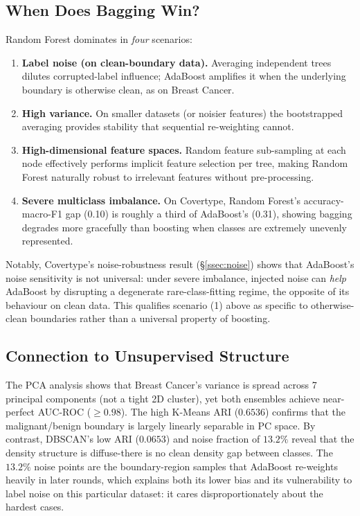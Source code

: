 \documentclass[conference]{IEEEtran}
\begin{document}
\subsection{When Does Bagging Win?}
Random Forest dominates in \emph{four} scenarios:
\begin{enumerate}
  \item \textbf{Label noise (on clean-boundary data).}  Averaging
        independent trees dilutes corrupted-label influence;
        AdaBoost amplifies it when the underlying boundary is
        otherwise clean, as on Breast Cancer.
  \item \textbf{High variance.}  On smaller datasets (or noisier
        features) the bootstrapped averaging provides stability
        that sequential re-weighting cannot.
  \item \textbf{High-dimensional feature spaces.}  Random feature
        sub-sampling at each node effectively performs implicit
        feature selection per tree, making Random Forest naturally
        robust to irrelevant features without pre-processing.
  \item \textbf{Severe multiclass imbalance.} On Covertype, Random
        Forest's accuracy-macro-F1 gap (0.10) is roughly a third of
        AdaBoost's (0.31), showing bagging degrades more gracefully than
        boosting when classes are extremely unevenly represented.
\end{enumerate}
Notably, Covertype's noise-robustness result (\S\ref{ssec:noise}) shows
that AdaBoost's noise sensitivity is not universal: under severe
imbalance, injected noise can \emph{help} AdaBoost by disrupting a
degenerate rare-class-fitting regime, the opposite of its behaviour
on clean data.  This qualifies scenario (1) above as specific to
otherwise-clean boundaries rather than a universal property of
boosting.

\subsection{Connection to Unsupervised Structure}
The PCA analysis shows that Breast Cancer's variance is spread across
7 principal components (not a tight 2D cluster), yet both ensembles
achieve near-perfect AUC-ROC ($\ge 0.98$).  The high K-Means ARI
($0.6536$) confirms that the malignant/benign boundary is largely
linearly separable in PC space.  By contrast, DBSCAN's low ARI
($0.0653$) and noise fraction of $13.2\%$ reveal that the
density structure is diffuse-there is no clean density gap between
classes.  The $13.2\%$ noise points are the boundary-region samples
that AdaBoost re-weights heavily in later rounds, which explains
both its lower bias and its vulnerability to label noise on this
particular dataset: it cares disproportionately about the hardest
cases.
\end{document}
